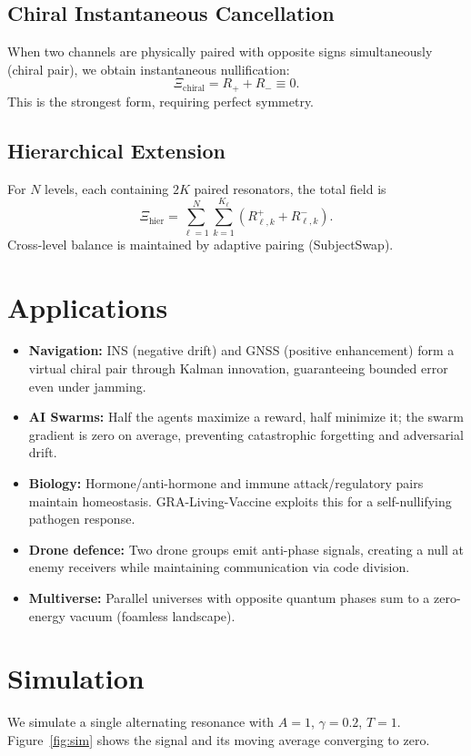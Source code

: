 \documentclass{article}
\begin{document}
\subsection{Chiral Instantaneous Cancellation}
When two channels are physically paired with opposite signs simultaneously (chiral pair), we obtain instantaneous nullification:
\begin{equation}
\Xi_{\text{chiral}} = R_+ + R_- \equiv 0.
\end{equation}
This is the strongest form, requiring perfect symmetry.

\subsection{Hierarchical Extension}
For $N$ levels, each containing $2K$ paired resonators, the total field is
\begin{equation}
\Xi_{\text{hier}} = \sum_{\ell=1}^N \sum_{k=1}^{K_\ell} (R_{\ell,k}^+ + R_{\ell,k}^-).
\end{equation}
Cross-level balance is maintained by adaptive pairing (SubjectSwap).

\section{Applications}
\begin{itemize}
\item \textbf{Navigation:} INS (negative drift) and GNSS (positive enhancement) form a virtual chiral pair through Kalman innovation, guaranteeing bounded error even under jamming.
\item \textbf{AI Swarms:} Half the agents maximize a reward, half minimize it; the swarm gradient is zero on average, preventing catastrophic forgetting and adversarial drift.
\item \textbf{Biology:} Hormone/anti-hormone and immune attack/regulatory pairs maintain homeostasis. GRA-Living-Vaccine exploits this for a self-nullifying pathogen response.
\item \textbf{Drone defence:} Two drone groups emit anti-phase signals, creating a null at enemy receivers while maintaining communication via code division.
\item \textbf{Multiverse:} Parallel universes with opposite quantum phases sum to a zero-energy vacuum (foamless landscape).
\end{itemize}

\section{Simulation}
We simulate a single alternating resonance with $A=1$, $\gamma=0.2$, $T=1$. 
Figure~\ref{fig:sim} shows the signal and its moving average converging to zero.
\end{document}
